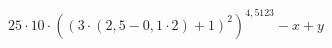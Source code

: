 \documentclass[a4paper]{article}
\begin{document}
$$
25\cdot{10}\cdot{\left(\left(3\cdot{\left(2,5-{0,1\cdot{2}}\right)}+{1}\right)^{2}\right)^{4,5123}}-{x}+{y}
$$
\end{document}
